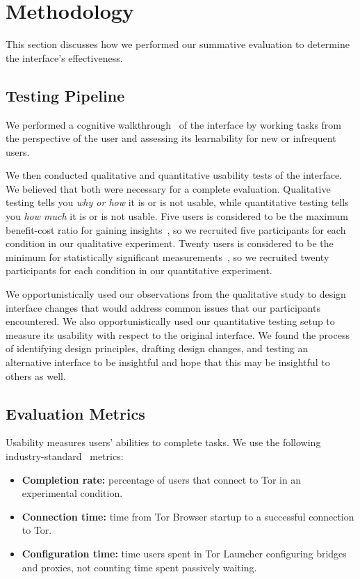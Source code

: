\documentclass[USenglish,oneside,twocolumn]{article}
\begin{document}
\section{Methodology} 
This section discusses how we performed our summative evaluation to determine the interface's effectiveness.

\subsection{Testing Pipeline} 
We performed a cognitive walkthrough~\cite{cognitive-walkthrough} of the interface by working tasks from the perspective of the user and assessing its learnability for new or infrequent users.

We then conducted qualitative and quantitative usability tests of the interface. We believed that both were necessary for a complete evaluation. Qualitative testing tells you {\it why or how} it is or is not usable, while quantitative testing tells you {\it how much} it is or is not usable. Five users is considered to be the maximum benefit-cost ratio for gaining insights~\cite{howmanyusers}, so we recruited five participants for each condition in our qualitative experiment. Twenty users is considered to be the minimum for statistically significant measurements~\cite{howmanyusers}, so we recruited twenty participants for each condition in our quantitative experiment.

We opportunistically used our observations from the qualitative study to design interface changes that would address common issues that our participants encountered. We also opportunistically used our quantitative testing setup to measure its usability with respect to the original interface. We found the process of identifying design principles, drafting design changes, and testing an alternative interface to be insightful and hope that this may be insightful to others as well. 

\subsection{Evaluation Metrics}
\label{sec:eval}
Usability measures users' abilities to complete tasks. We use the following industry-standard~\cite{albert2013measuring} metrics: \\

\begin{itemize}
\item {\bfseries Completion rate:}  percentage of users that connect to Tor in an experimental condition. 
\item {\bfseries Connection time:} time from Tor Browser startup to a successful connection to Tor. 
\item {\bfseries Configuration time:} time users spent in Tor Launcher configuring bridges and proxies, not counting time spent passively waiting.
\end{itemize}
\end{document}
